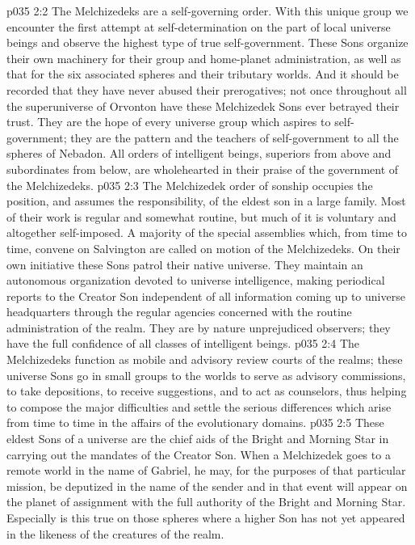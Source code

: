 \vs p035 2:2 The Melchizedeks are a self\hyp{}governing order. With this unique group we encounter the first attempt at self\hyp{}determination on the part of local universe beings and observe the highest type of true self\hyp{}government. These Sons organize their own machinery for their group and home\hyp{}planet administration, as well as that for the six associated spheres and their tributary worlds. And it should be recorded that they have never abused their prerogatives; not once throughout all the superuniverse of Orvonton have these Melchizedek Sons ever betrayed their trust. They are the hope of every universe group which aspires to self\hyp{}government; they are the pattern and the teachers of self\hyp{}government to all the spheres of Nebadon. All orders of intelligent beings, superiors from above and subordinates from below, are wholehearted in their praise of the government of the Melchizedeks.
\vs p035 2:3 \pc The Melchizedek order of sonship occupies the position, and assumes the responsibility, of the eldest son in a large family. Most of their work is regular and somewhat routine, but much of it is voluntary and altogether self\hyp{}imposed. A majority of the special assemblies which, from time to time, convene on Salvington are called on motion of the Melchizedeks. On their own initiative these Sons patrol their native universe. They maintain an autonomous organization devoted to universe intelligence, making periodical reports to the Creator Son independent of all information coming up to universe headquarters through the regular agencies concerned with the routine administration of the realm. They are by nature unprejudiced observers; they have the full confidence of all classes of intelligent beings.
\vs p035 2:4 The Melchizedeks function as mobile and advisory review courts of the realms; these universe Sons go in small groups to the worlds to serve as advisory commissions, to take depositions, to receive suggestions, and to act as counselors, thus helping to compose the major difficulties and settle the serious differences which arise from time to time in the affairs of the evolutionary domains.
\vs p035 2:5 These eldest Sons of a universe are the chief aids of the Bright and Morning Star in carrying out the mandates of the Creator Son. When a Melchizedek goes to a remote world in the name of Gabriel, he may, for the purposes of that particular mission, be deputized in the name of the sender and in that event will appear on the planet of assignment with the full authority of the Bright and Morning Star. Especially is this true on those spheres where a higher Son has not yet appeared in the likeness of the creatures of the realm.
